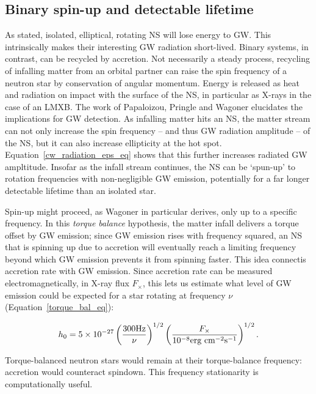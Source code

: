             \subsection{Binary spin-up and detectable lifetime}
            \label{spin-up}
         
As stated, isolated, elliptical, rotating NS will lose energy to GW.
This intrinsically makes their interesting GW radiation short-lived.
Binary systems, in contrast, can be recycled by accretion.
Not necessarily a steady process, recycling of infalling matter from an orbital partner can raise the spin frequency of a neutron star by conservation of angular momentum.
Energy is released as heat and radiation on impact with the surface of the NS, in particular as X-rays in the case of an LMXB.
The work of Papaloizou, Pringle and Wagoner elucidates the implications for GW detection.
As infalling matter hits an NS, the matter stream can not only increase the spin frequency -- and thus GW radiation amplitude -- of the NS, but it can also increase ellipticity at the hot spot.
Equation~\ref{cw_radiation_eps_eq} shows that this further increases radiated GW ampltitude.
Insofar as the infall stream continues, the NS can be `spun-up' to rotation frequencies with non-negligible GW emission, potentially for a far longer detectable lifetime than an isolated star.

Spin-up might proceed, as Wagoner in particular derives, only up to a specific frequency.
In this \textit{torque balance} hypothesis, the matter infall delivers a torque offset by GW emission; since GW emission rises with frequency squared, an NS that is spinning up due to accretion will eventually reach a limiting frequency beyond which GW emission prevents it from spinning faster.
This idea connectis accretion rate with GW emission.
Since accretion rate can be measured electromagnetically, in X-ray flux $F_\times$, this lets us estimate what level of GW emission could be expected for a star rotating at frequency $\nu$ (Equation~\ref{torque_bal_eq}): 

\begin{equation}
h_{0}=5\times10^{-27}\left(\frac{300\textup{Hz}}{\nu}\right)^{1/2}\left(\frac{F_{\times}}{10^{-8}\textup{erg cm}^{-2}\textup{s}^{-1}}\right)^{1/2}.
\label{torque_bal_eq}
\end{equation}

\noindent Torque-balanced neutron stars would remain at their torque-balance frequency: accretion would counteract spindown.
This frequency stationarity is computationally useful.

